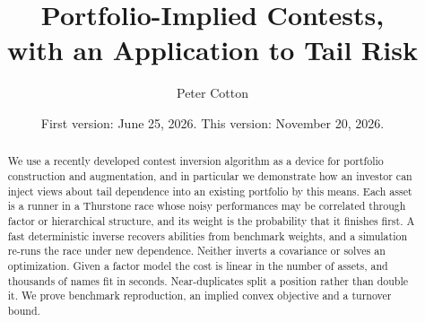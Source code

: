 \documentclass[11pt]{article}
\title{Portfolio-Implied Contests,\\
       with an Application to Tail Risk}
\author{Peter Cotton}
\date{First version: June 25, 2026. This version: November 20, 2026.}
\begin{document}
\maketitle

\begin{abstract}
We use a recently developed contest inversion algorithm as a device for portfolio
construction and augmentation, and in particular we demonstrate how an investor can
inject views about tail dependence into an existing portfolio by this means. Each
asset is a runner in a Thurstone race whose noisy performances may be correlated
through factor or hierarchical structure, and its weight is the probability that it
finishes first. A fast deterministic inverse recovers abilities from benchmark
weights, and a simulation re-runs the race under new dependence. Neither inverts a
covariance or solves an optimization. Given a factor model the cost is linear in the
number of assets, and thousands of names fit in seconds. Near-duplicates split a
position rather than double it. We prove benchmark reproduction, an implied convex
objective and a turnover bound.
\end{abstract}







\printbibliography
\end{document}
